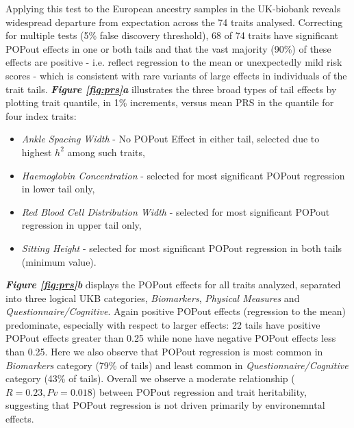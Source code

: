 \documentclass[times]{zHenriquesLab-StyleBioRxiv}
\newcommand\dref[2]{\normalsize{\textbf{\textit{Figure \ref{#1}#2}}}\normalsize{}}
\begin{document}
Applying this test to the European ancestry samples in the UK-biobank reveals widespread departure 
from expectation across the 74 traits analysed.  Correcting for multiple tests (5\% false discovery threshold), 
68 of 74 traits have significant POPout effects in one or both tails and that the vast majority (90\%) of these 
effects are positive - i.e. reflect regression to the mean or unexpectedly mild risk scores - 
which is consistent with rare variants of large effects in individuals of the trait tails. 
\dref{fig:prs}{a} illustrates the three broad types of tail effects by plotting trait quantile, 
in 1\% increments, versus mean PRS in the quantile for four index traits: 
\begin{itemize} 
    \item \textit{Ankle Spacing Width} - No POPout Effect in either tail, selected due to highest $h^2$ among such traits, 
    \item \textit{Haemoglobin Concentration} - selected for most significant POPout regression in lower tail only, 
    \item \textit{Red Blood Cell Distribution Width} - selected for most significant POPout regression in upper tail only, 
    \item \textit{Sitting Height} - selected for most significant POPout regression in both tails (minimum value).   
\end{itemize} 
        

\noindent \dref{fig:prs}{b} displays the POPout effects for all traits analyzed, separated into three logical UKB categories, \textit{Biomarkers}, \textit{Physical Measures} 
and \textit{Questionnaire/Cognitive}.  Again positive POPout effects (regression to the mean) predominate, especially with respect to larger effects: 22 tails have 
positive POPout effects greater than 0.25 while none have negative POPout effects less than 0.25.  Here we also observe that POPout regression is 
most common in \textit{Biomarkers} category (79\% of tails) and least common in \textit{Questionnaire/Cognitive} category (43\% of tails). Overall 
we observe a moderate relationship ($R=0.23,Pv=0.018$) between POPout regression and trait heritability, suggesting that POPout regression is 
not driven primarily by environemntal effects.  
\end{document}
